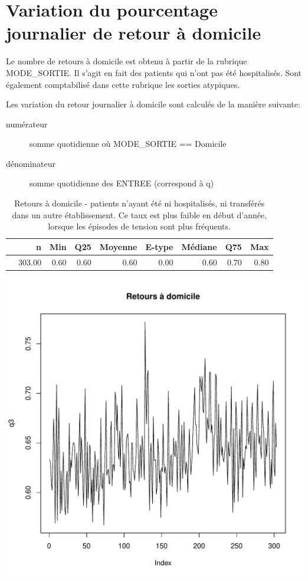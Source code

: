\documentclass[12pt,english,french,twoside]{report}\usepackage[]{graphicx}\usepackage[]{color}
\makeatletter
\def\maxwidth{ %
  \ifdim\Gin@nat@width>\linewidth
    \linewidth
  \else
    \Gin@nat@width
  \fi
}
\makeatother
\begin{document}
\section{Variation du pourcentage journalier de retour à domicile}

Le nombre de retours à domicile est obtenu à partir de la rubrique MODE\_SORTIE. Il s'agit en fait des patients qui n'ont pas été hospitalisés. Sont également comptabilisé dans cette rubrique les sorties atypiques.

Les variation du retour journalier à domicile sont calculés de la manière suivante:
\begin{description}
  \item[numérateur] somme quotidienne où MODE\_SORTIE == Domicile
  \item[dénominateur] somme quotidienne des ENTREE (correspond à q)
\end{description}

\begin{table}[ht]
\centering
\begin{tabular}{rrrrrrrrr}
  \hline
 & n & Min & Q25 & Moyenne & E-type & Médiane & Q75 & Max \\ 
  \hline
 & 303.00 & 0.60 & 0.60 & 0.60 & 0.00 & 0.60 & 0.70 & 0.80 \\ 
   \hline
\end{tabular}
\caption[Retour à domicile]{Retours à domicile - patients n'ayant été ni hospitalisés, ni transférés dans un autre établissement. Ce taux est plus faible en début d'année, lorsque les épisodes de tension sont plus fréquents.} 
\label{tab:rd}
\end{table}

\includegraphics[width=\maxwidth]{figure/retour_dom} 
\end{document}
